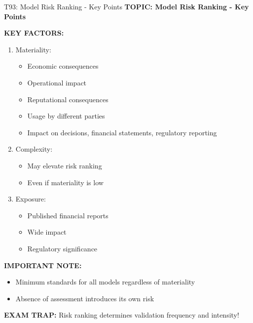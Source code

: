 \documentclass[8pt]{beamer}
\begin{document}
	\begin{frame}{T93: Model Risk Ranking - Key Points}
		\fontsize{6.5}{7.5}\selectfont
		\textbf{TOPIC: Model Risk Ranking - Key Points}
		
		\vspace{0.1cm}
		\textbf{KEY FACTORS:}
		\begin{enumerate}
			\item \textcolor{myblue}{Materiality:}
			\begin{itemize}
				\item Economic consequences
				\item Operational impact
				\item Reputational consequences
				\item Usage by different parties
				\item Impact on decisions, financial statements, regulatory reporting
			\end{itemize}
			\item \textcolor{myblue}{Complexity:}
			\begin{itemize}
				\item May elevate risk ranking
				\item Even if materiality is low
			\end{itemize}
			\item \textcolor{myblue}{Exposure:}
			\begin{itemize}
				\item Published financial reports
				\item Wide impact
				\item Regulatory significance
			\end{itemize}
		\end{enumerate}
		
		\vspace{0.1cm}
		\textbf{IMPORTANT NOTE:}
		\begin{itemize}
			\item Minimum standards for all models regardless of materiality
			\item Absence of assessment introduces its own risk
		\end{itemize}
		
		\textcolor{myred}{\textbf{EXAM TRAP:}} Risk ranking determines \textcolor{myblue}{validation frequency and intensity}!
	\end{frame}
	
\end{document}
